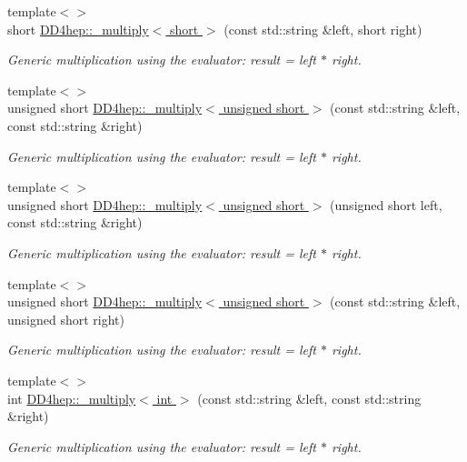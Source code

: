 \begin{DoxyCompactItemize}
{\footnotesize template$<$$>$ }\\short \hyperlink{group___d_d4_h_e_p___g_e_o_m_e_t_r_y_ga6153a90fb590d07eb9a3faf5cb6dbfe7}{D\+D4hep\+::\+\_\+multiply$<$ short $>$} (const std\+::string \&left, short right)
\begin{DoxyCompactList}\small\item\em Generic multiplication using the evaluator\+: result = left $\ast$ right. \end{DoxyCompactList}\item 
{\footnotesize template$<$$>$ }\\unsigned short \hyperlink{group___d_d4_h_e_p___g_e_o_m_e_t_r_y_ga12edc2766d9b966466af98cafef17c90}{D\+D4hep\+::\+\_\+multiply$<$ unsigned short $>$} (const std\+::string \&left, const std\+::string \&right)
\begin{DoxyCompactList}\small\item\em Generic multiplication using the evaluator\+: result = left $\ast$ right. \end{DoxyCompactList}\item 
{\footnotesize template$<$$>$ }\\unsigned short \hyperlink{group___d_d4_h_e_p___g_e_o_m_e_t_r_y_ga151db4de4140dfe6b027d2732a7811d1}{D\+D4hep\+::\+\_\+multiply$<$ unsigned short $>$} (unsigned short left, const std\+::string \&right)
\begin{DoxyCompactList}\small\item\em Generic multiplication using the evaluator\+: result = left $\ast$ right. \end{DoxyCompactList}\item 
{\footnotesize template$<$$>$ }\\unsigned short \hyperlink{group___d_d4_h_e_p___g_e_o_m_e_t_r_y_ga2b3d4e46a8022a46fa452eda0e9c538d}{D\+D4hep\+::\+\_\+multiply$<$ unsigned short $>$} (const std\+::string \&left, unsigned short right)
\begin{DoxyCompactList}\small\item\em Generic multiplication using the evaluator\+: result = left $\ast$ right. \end{DoxyCompactList}\item 
{\footnotesize template$<$$>$ }\\int \hyperlink{group___d_d4_h_e_p___g_e_o_m_e_t_r_y_gac0f9e0aae9992d84617607c75a9524fc}{D\+D4hep\+::\+\_\+multiply$<$ int $>$} (const std\+::string \&left, const std\+::string \&right)
\begin{DoxyCompactList}\small\item\em Generic multiplication using the evaluator\+: result = left $\ast$ right. \end{DoxyCompactList}\item 

\end{DoxyCompactItemize}

